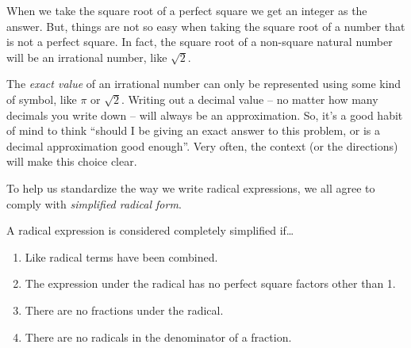 

When we take the square root of a perfect square we get an integer as the answer. But, things are not so easy when taking the square root of a number that is not a perfect square. In fact, the square root of a non-square natural number will be an irrational number, like $\sqrt{2}$.

The \textit{exact value} of an irrational number can only be represented using some kind of symbol, like $\pi$ or $\sqrt2$. Writing out a decimal value -- no matter how many decimals you write down -- will always be an approximation. So, it's a good habit of mind to think ``should I be giving an exact answer to this problem, or is a decimal approximation good enough''. Very often, the context (or the directions) will make this choice clear.

To help us standardize the way we write radical expressions, we all agree to comply with \textit{simplified radical form}.

\begin{boxcrit}
A radical expression is considered completely simplified if\ldots
\begin{enumerate}
\item Like radical terms have been combined.
\item The expression under the radical has no perfect square factors other than 1.
\item There are no fractions under the radical.
\item There are no radicals in the denominator of a fraction.
\end{enumerate}
\end{boxcrit}

